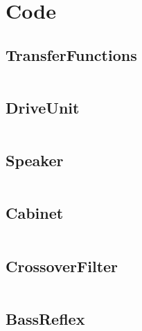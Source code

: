 \appendix

\chapter{Code}
\label{app:code}

\section{TransferFunctions}
\inputminted[linenos, breaklines, bgcolor=lightgray]{matlab}{../Matlab/TransferFunctions.m}

\section{DriveUnit}
\inputminted[linenos, breaklines, bgcolor=lightgray]{matlab}{../Matlab/DriveUnit.m}

\section{Speaker}
\inputminted[linenos, breaklines, bgcolor=lightgray]{matlab}{../Matlab/Speaker.m}

\section{Cabinet}
\inputminted[linenos, breaklines, bgcolor=lightgray]{matlab}{../Matlab/Cabinet.m}

\section{CrossoverFilter}
\inputminted[linenos, breaklines, bgcolor=lightgray]{matlab}{../Matlab/CrossoverFilter.m}

\section{BassReflex}
\inputminted[linenos, breaklines, bgcolor=lightgray]{matlab}{../Matlab/BassReflex.m}